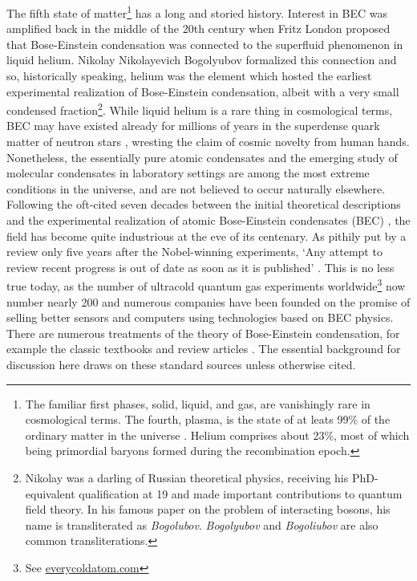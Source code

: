 	The fifth state of matter\footnote{The familiar first phases, solid, liquid, and gas, are vanishingly rare in cosmological terms.
	The fourth, plasma, is the state of at leats 99\% of the ordinary matter in the universe \cite{Plasmastuff}.
	Helium comprises about 23\%, most of which being primordial baryons formed during the recombination epoch.}  has a long and storied history\cite{Mukundanote}.
	Interest in BEC was amplified back in the middle of the 20th century when Fritz London proposed that Bose-Einstein condensation was connected to the superfluid phenomenon in liquid helium.
	Nikolay Nikolayevich Bogolyubov formalized this connection and so, historically speaking, helium was the element which hosted the earliest experimental realization of Bose-Einstein condensation, albeit with a very small condensed fraction\footnote{Nikolay was a darling of Russian theoretical physics, receiving his PhD-equivalent qualification at 19 and made important contributions to quantum field theory. In his famous paper on the problem of interacting bosons, his name is transliterated as \emph{Bogolubov}. \emph{Bogolyubov} and \emph{Bogoliubov} are also common transliterations.}.
	While liquid helium is a rare thing in cosmological terms, BEC may have existed already for millions of years in the superdense quark matter of neutron stars \cite{Haskell18, Martin16,Baym69,Page11}, wresting the claim of cosmic novelty from human hands. 
	Nonetheless, the essentially pure atomic condensates and the emerging study of molecular condensates in laboratory settings are among the most extreme conditions in the universe, and are not believed to occur naturally elsewhere.
	Following the oft-cited seven decades between the initial theoretical descriptions and the experimental realization of atomic Bose-Einstein condensates (BEC) \cite{Davis95,Bradley95,Anderson95}, the field has become quite industrious at the eve of its centenary.
	As pithily put by a review only five years after the Nobel-winning experiments, `Any attempt to review recent progress is out of date as soon as it is published' \cite{Courteille01}.
	This is no less true today, as the number of ultracold quantum gas experiments worldwide\footnote{See \url{everycoldatom.com}} now number nearly 200 and numerous companies have been founded on the promise of selling better sensors and computers using technologies based on BEC physics.
	There are numerous treatments of the theory of Bose-Einstein condensation, for example the classic textbooks \cite{PitaevskiiStringari,PethickSmith} and review articles \cite{Dalfovo99, Yukalov11_basics,Courteille01}.
	The essential background for discussion here draws on these standard sources unless otherwise cited.


